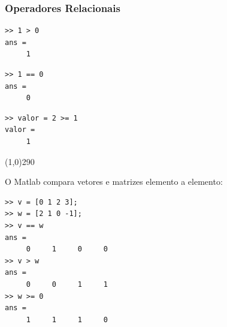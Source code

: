 \documentclass{beamer}
\newcommand{\delim}{\line(1,0){290}}
\begin{document}
\begin{frame}[fragile]
\frametitle{Operadores Relacionais}

{\scriptsize
\begin{center}
\begin{minipage}{3 cm}
\begin{verbatim}
>> 1 > 0
ans =
     1
\end{verbatim}
\end{minipage}
\begin{minipage}{3 cm}
\begin{verbatim}
>> 1 == 0
ans =
     0
\end{verbatim}
\end{minipage}
\begin{minipage}{3 cm}
\begin{verbatim}
>> valor = 2 >= 1
valor =
     1
\end{verbatim}
\end{minipage}
\end{center}
}
\delim
\pause

O Matlab compara vetores e matrizes elemento a elemento:
{\scriptsize
\begin{verbatim}
>> v = [0 1 2 3];
>> w = [2 1 0 -1];
>> v == w
ans =
     0     1     0     0
>> v > w
ans =
     0     0     1     1
>> w >= 0
ans =
     1     1     1     0
\end{verbatim}
}

\end{frame}
\end{document}
